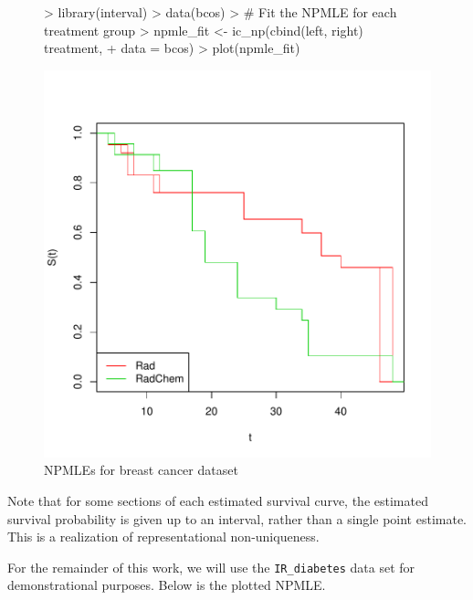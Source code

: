 \documentclass[a4paper]{article}
\begin{document}
\begin{figure}[H]  
\begin{center}  
\begin{Schunk}
\begin{Sinput}
> library(interval)
> data(bcos)
> # Fit the NPMLE for each treatment group
> npmle_fit <- ic_np(cbind(left, right) ~ treatment,
+              data = bcos)
> plot(npmle_fit)
\end{Sinput}
\end{Schunk}
\includegraphics{StatisticalBackground-004}
\caption{NPMLEs for breast cancer dataset}
\label{fig:NPMLE_intro}
\end{center}
\end{figure}

  Note that for some sections of each estimated survival curve, the estimated survival probability is given up to an interval, rather than a single point estimate. This is a realization of representational non-uniqueness. 
  
  For the remainder of this work, we will use the \texttt{IR\_diabetes} data set for demonstrational purposes. Below is the plotted NPMLE. 
\end{document}
